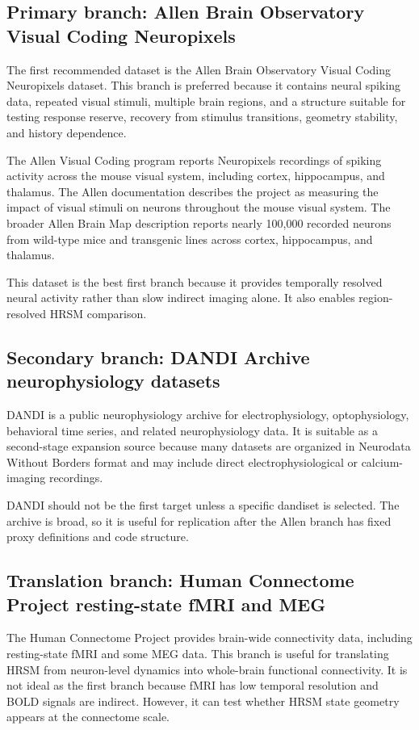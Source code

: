 \documentclass[11pt]{article}
\begin{document}
\subsection{Primary branch: Allen Brain Observatory Visual Coding Neuropixels}

The first recommended dataset is the Allen Brain Observatory Visual Coding Neuropixels dataset. This branch is preferred because it contains neural spiking data, repeated visual stimuli, multiple brain regions, and a structure suitable for testing response reserve, recovery from stimulus transitions, geometry stability, and history dependence.

The Allen Visual Coding program reports Neuropixels recordings of spiking activity across the mouse visual system, including cortex, hippocampus, and thalamus. The Allen documentation describes the project as measuring the impact of visual stimuli on neurons throughout the mouse visual system. The broader Allen Brain Map description reports nearly 100,000 recorded neurons from wild-type mice and transgenic lines across cortex, hippocampus, and thalamus.

This dataset is the best first branch because it provides temporally resolved neural activity rather than slow indirect imaging alone. It also enables region-resolved HRSM comparison.

\subsection{Secondary branch: DANDI Archive neurophysiology datasets}

DANDI is a public neurophysiology archive for electrophysiology, optophysiology, behavioral time series, and related neurophysiology data. It is suitable as a second-stage expansion source because many datasets are organized in Neurodata Without Borders format and may include direct electrophysiological or calcium-imaging recordings.

DANDI should not be the first target unless a specific dandiset is selected. The archive is broad, so it is useful for replication after the Allen branch has fixed proxy definitions and code structure.

\subsection{Translation branch: Human Connectome Project resting-state fMRI and MEG}

The Human Connectome Project provides brain-wide connectivity data, including resting-state fMRI and some MEG data. This branch is useful for translating HRSM from neuron-level dynamics into whole-brain functional connectivity. It is not ideal as the first branch because fMRI has low temporal resolution and BOLD signals are indirect. However, it can test whether HRSM state geometry appears at the connectome scale.
\end{document}
